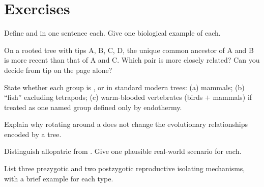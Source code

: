\section{Exercises}

\begin{exercise}[$\star$]\label{exo:g12:phylogeny-macroevolution:1}
Define  and  in one sentence each. Give one biological
example of each.
\end{exercise}

\begin{exercise}[$\star$]\label{exo:g12:phylogeny-macroevolution:2}
On a rooted tree with tips A, B, C, D, the unique common ancestor of A
and B is more recent than that of A and C. Which pair is more closely
related? Can you decide from tip  on the page alone?
\end{exercise}

\begin{exercise}[$\star$]\label{exo:g12:phylogeny-macroevolution:3}
State whether each group is ,  or 
in standard modern trees: (a) mammals; (b) ``fish'' excluding tetrapods;
(c) warm-blooded vertebrates (birds $+$ mammals) if treated as one
named group defined only by endothermy.
\end{exercise}

\begin{exercise}[$\star$]\label{exo:g12:phylogeny-macroevolution:4}
Explain why rotating  around a  does not change the
evolutionary relationships encoded by a tree.
\end{exercise}

\begin{exercise}[$\star\star$]\label{exo:g12:phylogeny-macroevolution:5}
Distinguish allopatric from . Give one plausible
real-world scenario for each.
\end{exercise}

\begin{exercise}[$\star\star$]\label{exo:g12:phylogeny-macroevolution:6}
List three prezygotic and two postzygotic reproductive isolating
mechanisms, with a brief example for each type.
\end{exercise}

